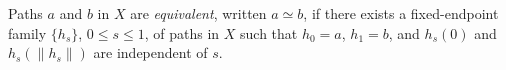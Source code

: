 Paths $a$ and $b$ in $X$ are \textit{equivalent}, written $a \simeq b$, if there exists a fixed-endpoint family $\{h_s\}$, $0 \leq s \leq 1$, of paths in $X$ such that $h_0 = a$, $h_1 = b$, and $h_s(0)$ and $h_s(\|h_s\|)$ are independent of $s$.
